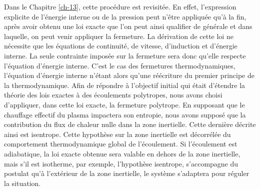 Dans le Chapitre \ref{ch-13}, cette procédure est revisitée. En effet, l'expression explicite de l'énergie interne ou de la pression peut n'être appliquée qu'à la fin, après avoir obtenu une loi exacte que l'on peut ainsi qualifier de générale et dans laquelle, on peut venir appliquer la fermeture. La dérivation de cette loi ne nécessite que les équations de continuité, de vitesse, d'induction et d'énergie interne. La seule contrainte imposée sur la fermeture sera donc qu'elle respecte l'équation d'énergie interne. C'est le cas des fermetures thermodynamiques, l'équation d'énergie interne n'étant alors qu'une réécriture du premier principe de la thermodynamique. Afin de répondre à l'objectif initial qui était d'étendre la théorie des lois exactes à des écoulements polytropes, nous avons choisi d'appliquer, dans cette loi exacte, la fermeture polytrope. En supposant que le chauffage effectif du plasma impactera son entropie, nous avons supposé que la contribution du flux de chaleur nulle dans la zone inertielle. Cette dernière décrite ainsi est isentrope. Cette hypothèse sur la zone inertielle est décorrélée du comportement thermodynamique global de l'écoulement. Si l'écoulement est adiabatique, la loi exacte obtenue sera valable en dehors de la zone inertielle, mais s'il est isotherme, par exemple, l'hypothèse isentrope, s'accompagne du postulat qu'à l'extérieur de la zone inertielle, le système s'adaptera pour réguler la situation. 

